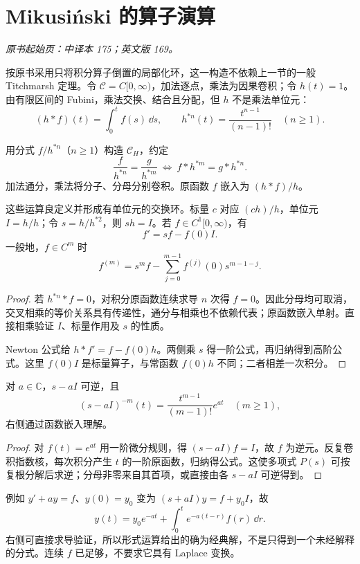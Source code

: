 \section{Mikusiński 的算子演算}\label{sec:yosida-06-06}
\noindent\textit{原书起始页：中译本 175；英文版 169。}

按原书采用只将积分算子倒置的局部化环，这一构造不依赖上一节的一般 Titchmarsh 定理。令 $\mathcal C=C[0,\infty)$，加法逐点，乘法为因果卷积；令 $h(t)=1$。由有限区间的 Fubini，乘法交换、结合且分配，但 $h$ 不是乘法单位元：
\[
 (h*f)(t)=\int_0^tf(s)\,\dd s,\qquad h^{*n}(t)=\frac{t^{n-1}}{(n-1)!}\quad(n\ge1).
\]

\begin{definition}[积分算子的局部化]
用分式 $f/h^{*n}$（$n\ge1$）构造 $\mathcal C_H$，约定
\[
 \frac f{h^{*n}}=\frac g{h^{*m}}
 \ \Longleftrightarrow\ f*h^{*m}=g*h^{*n}.
\]
加法通分，乘法将分子、分母分别卷积。原函数 $f$ 嵌入为 $(h*f)/h$。
\end{definition}

\begin{proposition}[局部化与微分规则]\label{prop:y6-operational}
这些运算良定义并形成有单位元的交换环。标量 $c$ 对应 $(ch)/h$，单位元 $I=h/h$；令 $s=h/h^{*2}$，则 $sh=I$。若 $f\in C^1[0,\infty)$，有
\[
 f'=sf-f(0)I.
\]
一般地，$f\in C^m$ 时
\[
 f^{(m)}=s^mf-\sum_{j=0}^{m-1}f^{(j)}(0)s^{m-1-j}.
\]
\end{proposition}
\begin{proof}
若 $h^{*n}*f=0$，对积分原函数连续求导 $n$ 次得 $f=0$。因此分母均可取消，交叉相乘的等价关系具有传递性，通分与相乘也不依赖代表；原函数嵌入单射。直接相乘验证 $I$、标量作用及 $s$ 的性质。

Newton 公式给 $h*f'=f-f(0)h$。两侧乘 $s$ 得一阶公式，再归纳得到高阶公式。这里 $f(0)I$ 是标量算子，与常函数 $f(0)h$ 不同；二者相差一次积分。
\end{proof}

\begin{proposition}[指数核与常系数初值问题]
对 $a\in\mathbb C$，$s-aI$ 可逆，且
\[
 (s-aI)^{-m}(t)=\frac{t^{m-1}}{(m-1)!}e^{at}\quad(m\ge1),
\]
右侧通过函数嵌入理解。
\end{proposition}
\begin{proof}
对 $f(t)=e^{at}$ 用一阶微分规则，得 $(s-aI)f=I$，故 $f$ 为逆元。反复卷积指数核，每次积分产生 $t$ 的一阶原函数，归纳得公式。这使多项式 $P(s)$ 可按复根分解后求逆；分母非零来自其首项，或直接由各 $s-aI$ 可逆得到。
\end{proof}

例如 $y'+ay=f$、$y(0)=y_0$ 变为 $(s+aI)y=f+y_0I$，故
\[
 y(t)=y_0e^{-at}+\int_0^te^{-a(t-r)}f(r)\,\dd r.
\]
右侧可直接求导验证，所以形式运算给出的确为经典解，不是只得到一个未经解释的分式。连续 $f$ 已足够，不要求它具有 Laplace 变换。

